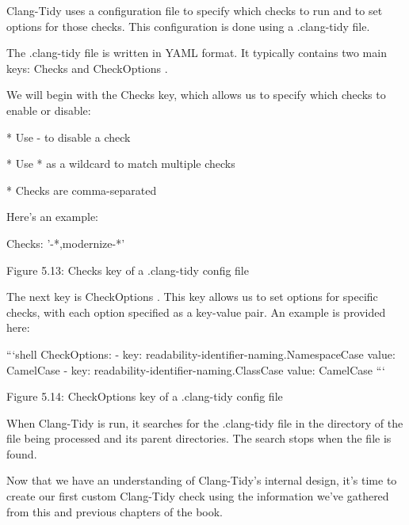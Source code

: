 \begin{markdown}

Clang-Tidy uses a configuration file to specify which checks to run and to set options for those checks. This configuration is done using a .clang-tidy file.

The .clang-tidy file is written in YAML format. It typically contains two main keys: Checks and CheckOptions .

We will begin with the Checks key, which allows us to specify which checks to enable or disable:

* Use - to disable a check

* Use * as a wildcard to match multiple checks

* Checks are comma-separated

Here's an example:

\begin{shell}
Checks: '-*,modernize-*'
\end{shell}

\begin{center}
Figure 5.13: Checks key of a .clang-tidy config file
\end{center}

The next key is CheckOptions . This key allows us to set options for specific checks, with each option specified as a key-value pair. An example is provided here:

```shell
CheckOptions:
- key: readability-identifier-naming.NamespaceCase
  value: CamelCase
- key: readability-identifier-naming.ClassCase
  value: CamelCase
```

\begin{center}
Figure 5.14: CheckOptions key of a .clang-tidy config file
\end{center}

When Clang-Tidy is run, it searches for the .clang-tidy file in the directory of the file being processed and its parent directories. The search stops when the file is found.

Now that we have an understanding of Clang-Tidy's internal design, it's time to create our first custom Clang-Tidy check using the information we've gathered from this and previous chapters of the book.


\end{markdown}



























